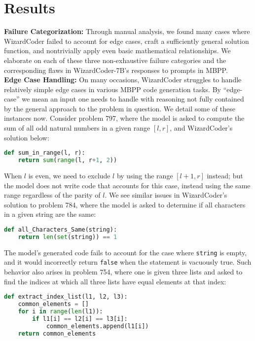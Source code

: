 \documentclass[10pt]{article}
\newcommand{\code}[1]{\texttt{#1}}
\theoremstyle{definition}
\begin{document}
\section{Results}
\noindent\textbf{Failure Categorization:} Through manual analysis, we found many cases where WizardCoder failed to account for edge cases, craft a sufficiently general solution function, and nontrivially apply even basic mathematical relationships. We elaborate on each of these three non-exhaustive failure categories and the corresponding flaws in WizardCoder-7B's responses to prompts in MBPP.\\

\noindent\textbf{Edge Case Handling:} On many occasions, WizardCoder struggles to handle relatively simple edge cases in various MBPP code generation tasks. By ``edge-case'' we mean an input one needs to handle with reasoning not fully contained by the general approach to the problem in question. We detail some of these instances now. Consider problem 797, where the model is asked to compute the sum of all odd natural numbers in a given range $[l, r]$, and WizardCoder's solution below:
\begin{lstlisting}[language=Python]
def sum_in_range(l, r):
    return sum(range(l, r+1, 2))
\end{lstlisting}
\noindent When $l$ is even, we need to exclude $l$ by using the range $[l+1, r]$ instead; but the model does not write code that accounts for this case, instead using the same range regardless of the parity of $l$. We see similar issues in WizardCoder's solution to problem 784, where the model is asked to determine if all characters in a given string are the same:
\begin{lstlisting}[language=Python]
def all_Characters_Same(string):
    return len(set(string)) == 1
\end{lstlisting}
\noindent The model's generated code fails to account for the case where \code{string} is empty, and it would incorrectly return \code{false} when the statement is vacuously true. Such behavior also arises in problem 754, where one is given three lists and asked to find the indices at which all three lists have equal elements at that index:
\begin{lstlisting}[language=Python]
def extract_index_list(l1, l2, l3):
    common_elements = []
    for i in range(len(l1)):
        if l1[i] == l2[i] == l3[i]:
            common_elements.append(l1[i])
    return common_elements
\end{lstlisting}
\end{document}
